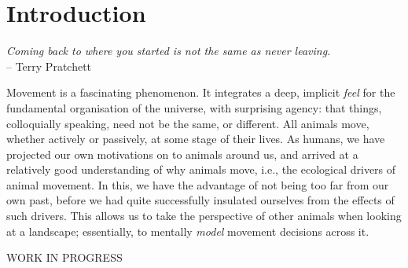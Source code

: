 
%
\chapter*{Introduction}

{}

\begin{center}
    \emph{Coming back to where you started is not the same as never leaving.}\\
    \medskip
    -- \small{Terry Pratchett}
\end{center}

Movement is a fascinating phenomenon.
It integrates a deep, implicit \textit{feel} for the fundamental organisation of the universe, with surprising agency: that things, colloquially speaking, need not be the same, or different.
All animals move, whether actively or passively, at some stage of their lives.
As humans, we have projected our own motivations on to animals around us, and arrived at a relatively good understanding of why animals move, i.e., the ecological drivers of animal movement.
In this, we have the advantage of not being too far from our own past, before we had quite successfully insulated ourselves from the effects of such drivers.
This allows us to take the perspective of other animals when looking at a landscape; essentially, to mentally \textit{model} movement decisions across it.

{\color{red} WORK IN PROGRESS}

\vfill

\clearpage
